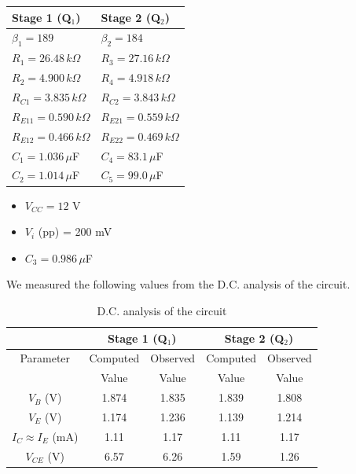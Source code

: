 \begin{table}[H]
    \centering
    \begin{tabular}{ll}
    \hline
    \textbf{Stage 1} (Q$_1$)  & \textbf{Stage 2} (Q$_2$)  \\ \hline
    $\beta_1 = 189$ & $\beta_2 = 184$ \\
    $R_1 = 26.48\,k\Omega$ & $R_3 = 27.16\,k\Omega$ \\
    $R_2 = 4.900\,k\Omega$ & $R_4 = 4.918\,k\Omega$ \\
    $R_{C1} = 3.835\,k\Omega$ & $R_{C2} = 3.843\,k\Omega$ \\
    $R_{E11} = 0.590\,k\Omega$ & $R_{E21} = 0.559\,k\Omega$ \\
    $R_{E12} = 0.466\,k\Omega$ & $R_{E22} = 0.469\,k\Omega$ \\
    $C_{1} = 1.036\,\mu$F & $C_{4} = 83.1\,\mu$F \\
    $C_{2} = 1.014\,\mu$F & $C_{5} = 99.0\,\mu$F \\
    \hline
    \end{tabular}
    \label{tab:1}
\end{table}

\begin{itemize}
    \item $V_{CC} = 12$ V
    \item $V_i$ (pp) = 200 mV
    \item $C_3 = 0.986\,\mu$F\\
\end{itemize}

We measured the following values from the D.C. analysis of the circuit.

\begin{table}[H]
    \centering
    \begin{tabular}{|c|c|c|c|c|}
    \hline
     & \multicolumn{2}{|c|}{Stage 1 (Q$_1$)} & \multicolumn{2}{|c|}{Stage 2 (Q$_2$)} \\ \hline
    Parameter & Computed  & Observed  & Computed  & Observed\\
     &  Value &  Value &  Value &  Value\\ \hline
    $V_B$ (V) & 1.874  &  1.835 & 1.839  &  1.808 \\
    $V_E$ (V) & 1.174  &  1.236 & 1.139  &  1.214 \\
    $I_C\approx I_E$ (mA) & 1.11 & 1.17 & 1.11  &  1.17 \\
    $V_{CE}$ (V) & 6.57 & 6.26 & 1.59  &  1.26 \\
    \hline
    \end{tabular}
    \caption{D.C. analysis of the circuit}
    \label{tab:2}
\end{table}

